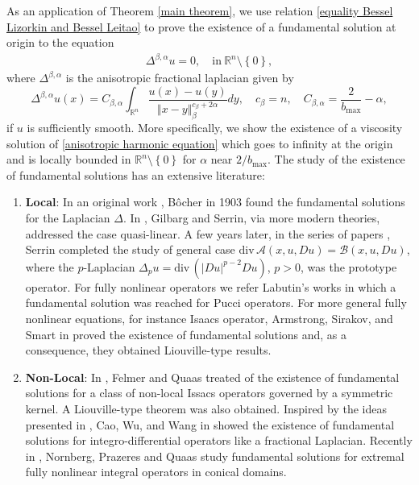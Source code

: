 \documentclass[10pt, leqno]{article}
\def \div {\mathrm{div}}
\theoremstyle{definition}
\theoremstyle{remark}
\numberwithin{equation}{section}
\begin{document}
As an application of Theorem \ref{main theorem}, we use relation \eqref{equality Bessel Lizorkin and Bessel Leitao} to prove the existence of a fundamental solution at origin to the equation
\begin{eqnarray}
\label{anisotropic harmonic equation}
\Delta^{\beta, \alpha} u = 0, \quad \text{in} \ \mathbb{R}^{n} \setminus \left\lbrace 0 \right\rbrace,
\end{eqnarray}
where $\Delta^{\beta, \alpha}$ is the anisotropic fractional laplacian given by
$$
\Delta^{\beta, \alpha}u (x) = C_{\beta, \alpha} \int_{\mathbb{R}^{n}} \dfrac{u(x) - u(y)}{\Vert x - y \Vert_{\beta}^{c_{\beta}+2\alpha}} dy, \quad c_{\beta} = n, \quad C_{\beta, \alpha} = \dfrac{2}{b_{\max}} - \alpha,
$$
if $u$ is sufficiently smooth. More specifically, we show the existence of a viscosity solution of \eqref{anisotropic harmonic equation} which goes to infinity at the origin and is locally bounded in $\mathbb{R}^{n} \setminus \left \lbrace 0 \right \rbrace$ for $\alpha$ near $2/b_{\max}$. The study of the existence of fundamental solutions has an extensive literature:
\begin{enumerate}
\item \textbf{Local}: In an original work \cite{BOCHER}, B\^ocher in 1903 found the fundamental solutions for the Laplacian $\Delta$. In \cite{GSer}, Gilbarg and Serrin, via more modern theories, addressed the case quasi-linear. A few years later, in the series of papers \cite{Ser 1, Ser 2, Ser 3}, Serrin completed the study of general case $\text{div} \, \mathcal{A}(x,u, Du) = \mathcal{B}(x, u, Du)$, where the $p$-Laplacian $\Delta_{p}u= \div \, \left( \vert D u \vert^{p-2} D u \right)$, $p>0$, was the prototype operator. For fully nonlinear operators we refer Labutin's works \cite{LABUTIN 1, LABUTIN 2} in which a fundamental solution was reached for Pucci operators. For more general fully nonlinear equations, for instance Isaacs operator, Armstrong, Sirakov, and Smart in \cite{ASS 1, ASS 2} proved the existence of fundamental solutions and, as a consequence, they obtained Liouville-type results.
\item \textbf{Non-Local}: In \cite{FQ 1, FQ 2}, Felmer and Quaas treated of the existence of fundamental solutions for a class of non-local Issacs operators governed by a symmetric kernel. A Liouville-type theorem was also obtained. Inspired by the ideas presented in \cite{ASS 1, ASS 2}, Cao, Wu, and Wang in \cite{CWW} showed the existence of fundamental solutions for integro-differential operators like a fractional Laplacian. Recently in \cite{NPQUAAS}, Nornberg, Prazeres and Quaas study fundamental solutions for extremal fully nonlinear integral operators in conical domains.
\end{enumerate}
\end{document}
